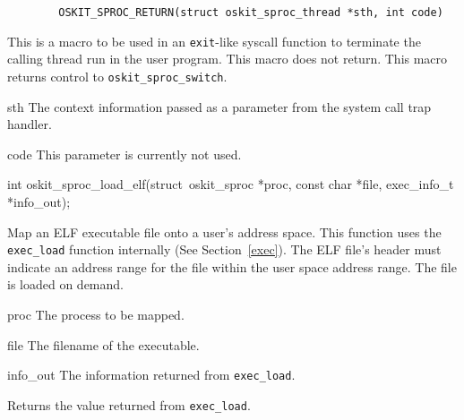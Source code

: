 \begin{apisyn}

        \begin{verbatim}
        OSKIT_SPROC_RETURN(struct oskit_sproc_thread *sth, int code)
        \end{verbatim}

\end{apisyn}
\begin{apidesc}
 
        This is a macro to be used in an \texttt{exit}-like syscall
        function to terminate the calling thread run in the user
        program.  This macro does not return.  This macro returns
        control to \texttt{oskit_sproc_switch}.

\end{apidesc}
\begin{apiparm}
        \item[sth]
                The context information passed as a parameter from
                the system call trap handler.
        \item[code]
                This parameter is currently not used.
\end{apiparm}


\begin{apisyn}

        \funcproto int      oskit_sproc_load_elf(struct~oskit_sproc *proc, const char *file, 
                                \outparam exec_info_t *info_out);

\end{apisyn}
\begin{apidesc}
 
       Map an ELF executable file onto a user's address space.  This
       function uses the \texttt{exec_load} function internally (See
       Section~\ref{exec}).  The ELF file's header must indicate an
       address range for the file within the user space address
       range.  The file is loaded on demand.

\end{apidesc}
\begin{apiparm}
        \item[proc]
                The process to be mapped.
        \item[file]
                The filename of the executable.
        \item[info_out]
                The information returned from \texttt{exec_load}.
\end{apiparm}
\begin{apiret}
        Returns the value returned from \texttt{exec_load}.
\end{apiret}

